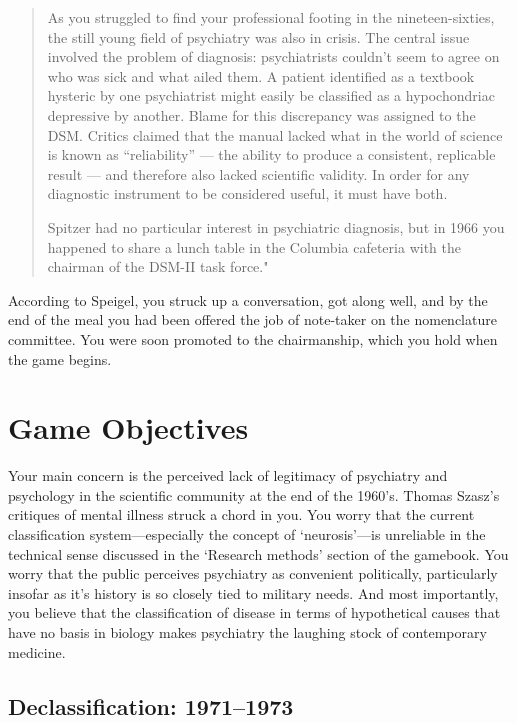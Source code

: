 \begin{refsection}
\begin{quote}
As you struggled to find your professional footing in the nineteen-sixties, the still young field of psychiatry was also in crisis. The central issue involved the problem of diagnosis: psychiatrists couldn't seem to agree on who was sick and what ailed them. A patient identified as a textbook hysteric by one psychiatrist might easily be classified as a hypochondriac depressive by another. Blame for this discrepancy was assigned to the DSM. Critics claimed that the manual lacked what in the world of science is known as ``reliability'' --- the ability to produce a consistent, replicable result --- and therefore also lacked scientific validity. In order for any diagnostic instrument to be considered useful, it must have both.

Spitzer had no particular interest in psychiatric diagnosis, but in 1966 you happened to share a lunch table in the Columbia cafeteria with the chairman of the DSM-II task force."
\end{quote}

According to Speigel, you struck up a conversation, got along well, and by the end of the meal you had been offered the job of note-taker on the nomenclature committee. You were soon promoted to the chairmanship, which you hold when the game begins.

\section{Game Objectives}
\label{gameobjectives}

Your main concern is the perceived lack of legitimacy of psychiatry and psychology in the scientific community at the end of the 1960's. Thomas Szasz's critiques of mental illness struck a chord in you. You worry that the current classification system---especially the concept of `neurosis'---is unreliable in the technical sense discussed in the `Research methods' section of the gamebook. You worry that the public perceives psychiatry as convenient politically, particularly insofar as it's history is so closely tied to military needs. And most importantly, you believe that the classification of disease in terms of hypothetical causes that have no basis in biology makes psychiatry the laughing stock of contemporary medicine.

\subsection{Declassification: 1971--1973}
\label{declassification:1971-1973}


\end{refsection}
